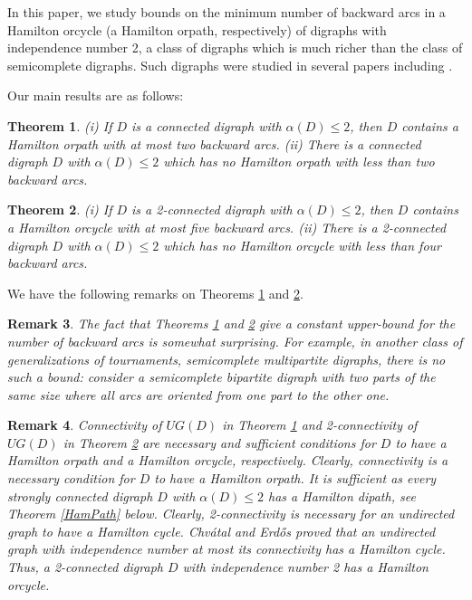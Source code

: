 \documentclass{article}
\newcommand{\2}{\vspace{2mm}}
\newtheorem{theorem}{Theorem}[section]
\newtheorem{remark}[theorem]{Remark}
\theoremstyle{definition}
\begin{document}
In this paper, we study bounds on the minimum number of backward arcs in a Hamilton orcycle (a Hamilton orpath, respectively) of digraphs with independence number 2, a class of digraphs which is much richer than the class of semicomplete digraphs.
Such digraphs were studied in several papers including \cite{BangJensen2006+,Bondy1995ShortProofChenManalastas,chen_manalastas_1983,FrickKatrenic2008,FrickEtAl2008,Havet2004,AardtEtAl2010}.

Our main results are as follows:

\begin{theorem} \label{mainHP}
(i) If $D$ is a connected digraph with $\alpha(D) \leq 2$, then $D$ contains a Hamilton orpath with at most two backward arcs. (ii) There is a connected digraph $D$ with $\alpha(D) \leq 2$ which has no Hamilton orpath with less than two backward arcs. 
\end{theorem}


\begin{theorem} \label{mainHC}
(i) If $D$ is a 2-connected digraph with $\alpha(D) \leq 2$, then $D$ contains a Hamilton orcycle with at most five backward arcs. (ii) There is a 2-connected digraph $D$ with $\alpha(D) \leq 2$ which has no Hamilton orcycle with less than four backward arcs. 
\end{theorem}

We have the following remarks on Theorems \ref{mainHP} and \ref{mainHC}.

\begin{remark}
The fact that Theorems \ref{mainHP} and \ref{mainHC} give a constant  upper-bound for the number of backward arcs  is somewhat surprising. For example, in another class of generalizations of tournaments, semicomplete multipartite digraphs, there is no such a bound: consider a semicomplete bipartite digraph with two parts of the same size where all arcs are oriented from one part to the other one. 
\end{remark}

\begin{remark}
Connectivity of $UG(D)$ in Theorem \ref{mainHP} and 2-connectivity of $UG(D)$ in Theorem \ref{mainHC} are necessary and sufficient conditions for $D$ to have a Hamilton orpath and a Hamilton orcycle, respectively. Clearly, connectivity is a necessary condition for $D$ to have a Hamilton orpath. It is sufficient as every strongly connected digraph $D$ with $\alpha(D)\le 2$ has a Hamilton dipath, see Theorem \ref{HamPath} below. Clearly, 2-connectivity is necessary for an undirected graph to have a Hamilton cycle. Chv{\'a}tal  and Erd{\H{o}}s \cite{ChEr72} proved that 
an undirected graph with independence number at most its connectivity has a Hamilton cycle. Thus, a 2-connected digraph $D$ with independence number 2 has a Hamilton orcycle. 
\end{remark}
\end{document}
